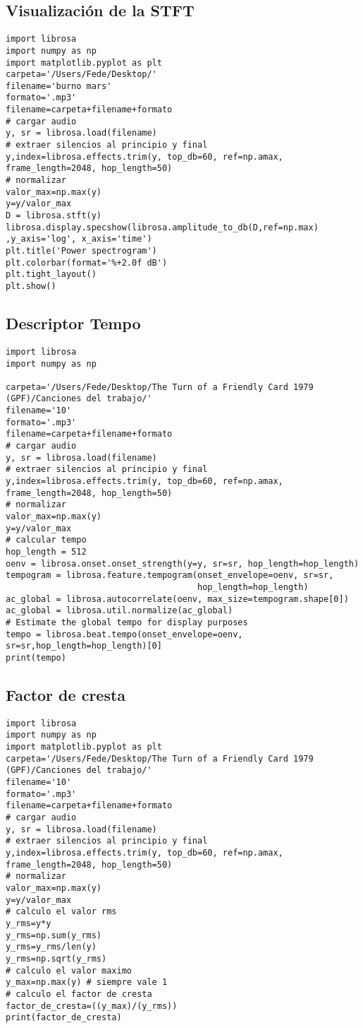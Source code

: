 \documentclass[]{article}
\begin{document}
\subsection{Visualización de la STFT}
\label{stft}
\begin{verbatim}
import librosa
import numpy as np
import matplotlib.pyplot as plt
carpeta='/Users/Fede/Desktop/'
filename='burno mars'
formato='.mp3'
filename=carpeta+filename+formato
# cargar audio
y, sr = librosa.load(filename)
# extraer silencios al principio y final
y,index=librosa.effects.trim(y, top_db=60, ref=np.amax, frame_length=2048, hop_length=50)
# normalizar
valor_max=np.max(y)
y=y/valor_max
D = librosa.stft(y)
librosa.display.specshow(librosa.amplitude_to_db(D,ref=np.max)
,y_axis='log', x_axis='time')
plt.title('Power spectrogram')
plt.colorbar(format='%+2.0f dB')
plt.tight_layout()
plt.show()
\end{verbatim}

\subsection{Descriptor Tempo}
\label{tempo}
\begin{verbatim}
import librosa
import numpy as np

carpeta='/Users/Fede/Desktop/The Turn of a Friendly Card 1979 (GPF)/Canciones del trabajo/'
filename='10'
formato='.mp3'
filename=carpeta+filename+formato
# cargar audio
y, sr = librosa.load(filename)
# extraer silencios al principio y final
y,index=librosa.effects.trim(y, top_db=60, ref=np.amax, frame_length=2048, hop_length=50)
# normalizar
valor_max=np.max(y)
y=y/valor_max
# calcular tempo
hop_length = 512
oenv = librosa.onset.onset_strength(y=y, sr=sr, hop_length=hop_length)
tempogram = librosa.feature.tempogram(onset_envelope=oenv, sr=sr,
                                      hop_length=hop_length)
ac_global = librosa.autocorrelate(oenv, max_size=tempogram.shape[0])
ac_global = librosa.util.normalize(ac_global)
# Estimate the global tempo for display purposes
tempo = librosa.beat.tempo(onset_envelope=oenv, sr=sr,hop_length=hop_length)[0]
print(tempo)
\end{verbatim}

\subsection{Factor de cresta}
\label{factor de cresta}
\begin{verbatim}
import librosa
import numpy as np
import matplotlib.pyplot as plt
carpeta='/Users/Fede/Desktop/The Turn of a Friendly Card 1979 (GPF)/Canciones del trabajo/'
filename='10'
formato='.mp3'
filename=carpeta+filename+formato
# cargar audio
y, sr = librosa.load(filename)
# extraer silencios al principio y final
y,index=librosa.effects.trim(y, top_db=60, ref=np.amax, frame_length=2048, hop_length=50)
# normalizar
valor_max=np.max(y)
y=y/valor_max
# calculo el valor rms
y_rms=y*y
y_rms=np.sum(y_rms)
y_rms=y_rms/len(y)
y_rms=np.sqrt(y_rms)
# calculo el valor maximo
y_max=np.max(y) # siempre vale 1
# calculo el factor de cresta
factor_de_cresta=((y_max)/(y_rms))
print(factor_de_cresta)
\end{verbatim}
\end{document}
